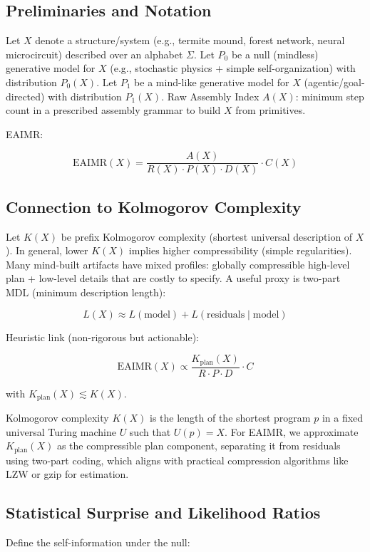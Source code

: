 \documentclass{article}
\begin{document}
\subsection{Preliminaries and Notation}
Let $X$ denote a structure/system (e.g., termite mound, forest network, neural microcircuit) described over an alphabet $\Sigma$. Let $P_0$ be a null (mindless) generative model for $X$ (e.g., stochastic physics + simple self-organization) with distribution $P_0(X)$. Let $P_1$ be a mind-like generative model for $X$ (agentic/goal-directed) with distribution $P_1(X)$. Raw Assembly Index $A(X)$: minimum step count in a prescribed assembly grammar to build $X$ from primitives.

EAIMR:

\[ \mathrm{EAIMR}(X) = \frac{A(X)}{R(X) \cdot P(X) \cdot D(X)} \cdot C(X) \]

\subsection{Connection to Kolmogorov Complexity}
Let $K(X)$ be prefix Kolmogorov complexity (shortest universal description of $X$). In general, lower $K(X)$ implies higher compressibility (simple regularities). Many mind-built artifacts have mixed profiles: globally compressible high-level plan + low-level details that are costly to specify. A useful proxy is two-part MDL (minimum description length):

\[ L(X) \approx L(\mathrm{model}) + L(\mathrm{residuals} \mid \mathrm{model}) \]

Heuristic link (non-rigorous but actionable):

\[ \mathrm{EAIMR}(X) \propto \frac{K_{\mathrm{plan}}(X)}{R \cdot P \cdot D} \cdot C \]

with $K_{\mathrm{plan}}(X) \lesssim K(X)$.

Kolmogorov complexity $K(X)$ is the length of the shortest program $p$ in a fixed universal Turing machine $U$ such that $U(p) = X$. For EAIMR, we approximate $K_{\mathrm{plan}}(X)$ as the compressible plan component, separating it from residuals using two-part coding, which aligns with practical compression algorithms like LZW or gzip for estimation.

\subsection{Statistical Surprise and Likelihood Ratios}
Define the self-information under the null:
\end{document}
